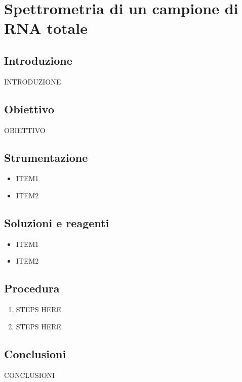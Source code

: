 \section {Spettrometria di un campione di RNA totale}

\subsection{Introduzione}
INTRODUZIONE

\subsection{Obiettivo}
OBIETTIVO

\subsection{Strumentazione}
\begin{itemize}
  \item ITEM1
  \item ITEM2
\end{itemize}

\subsection{Soluzioni e reagenti}
\begin{itemize}
  \item ITEM1
  \item ITEM2
\end{itemize}

\newpage

\subsection{Procedura}
\begin{enumerate}
  \item STEPS HERE
  \item STEPS HERE
\end{enumerate}

\subsection{Conclusioni}

CONCLUSIONI
\newpage